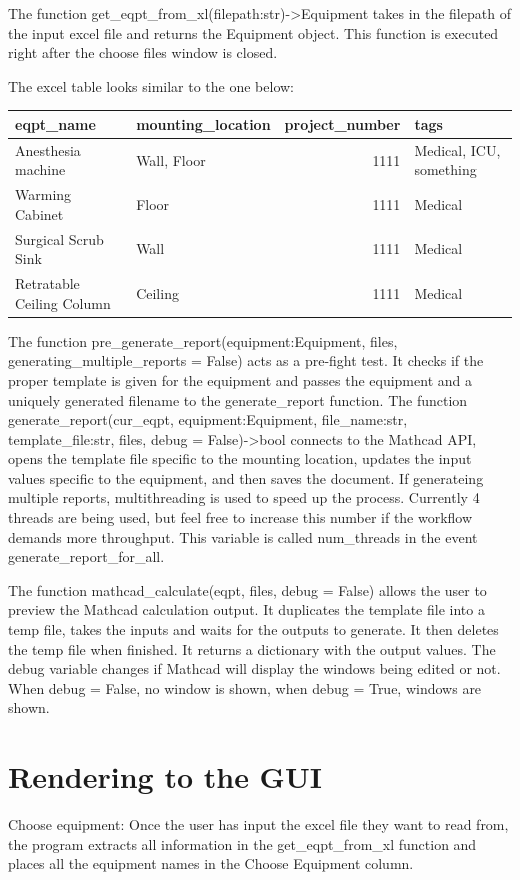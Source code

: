 \documentclass[11pt]{article}
\begin{document}
The function get\_eqpt\_from\_xl(filepath:str)->Equipment takes in the filepath of the input excel file and returns the Equipment object. This function is executed right after the choose files window is closed.

The excel table looks similar to the one below:
\begin{center}
\begin{tabular}{llrl}
\hline
eqpt\_name & mounting\_location & project\_number & tags\\
\hline
Anesthesia machine & Wall, Floor & 1111 & Medical, ICU, something\\
Warming Cabinet & Floor & 1111 & Medical\\
Surgical Scrub Sink & Wall & 1111 & Medical\\
Retratable Ceiling Column & Ceiling & 1111 & Medical\\
\hline
\end{tabular}
\end{center}

The function pre\_generate\_report(equipment:Equipment, files, generating\_multiple\_reports = False) acts as a pre-fight test. It checks if the proper template is given for the equipment and passes the equipment and a uniquely generated filename to the generate\_report function. The function generate\_report(cur\_eqpt, equipment:Equipment, file\_name:str, template\_file:str, files, debug = False)->bool connects to the Mathcad API, opens the template file specific to the mounting location, updates the input values specific to the equipment, and then saves the document. If generateing multiple reports, multithreading is used to speed up the process. Currently 4 threads are being used, but feel free to increase this number if the workflow demands more throughput. This variable is called num\_threads in the event generate\_report\_for\_all.

The function mathcad\_calculate(eqpt, files, debug = False) allows the user to preview the Mathcad calculation output. It duplicates the template file into a temp file, takes the inputs and waits for the outputs to generate. It then deletes the temp file when finished. It returns a dictionary with the output values. The debug variable changes if Mathcad will display the windows being edited or not. When debug = False, no window is shown, when debug = True, windows are shown.

\section{Rendering to the GUI}
\label{sec:org8f9190b}
Choose equipment: Once the user has input the excel file they want to read from, the program extracts all information in the get\_eqpt\_from\_xl function and places all the equipment names in the Choose Equipment column.
\end{document}

